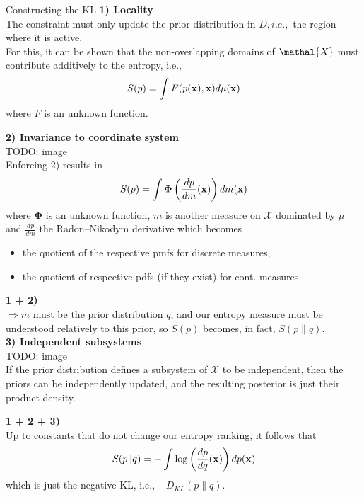 \documentclass[11pt,compress,t,notes=noshow, xcolor=table]{beamer}
\begin{document}
\begin{vbframe}{Constructing the KL}
    \textbf{1) Locality} \\
    The constraint must only update the prior distribution in $D, i.e.,$ the region where it is active. \\

    \lz
    For this, it can be shown that the non-overlapping domains of $\mathal{X}$ must contribute additively to the entropy, i.e.,
    $$S(p) = \int F(p(\mathbf{x}), \mathbf{x}) d\mu(\mathbf{x})$$
    where $F$ is an unknown function.
    
    \framebreak
    
    \textbf{2) Invariance to coordinate system} \\
    \lz 
    TODO: image \\
    \lz
    Enforcing 2) results in 
    $$S(p) = \int \bm{\Phi}\left(\frac{dp}{dm}(\mathbf{x})\right)dm(\mathbf{x})$$
    where $\bm{\Phi}$ is an unknown function, $m$ is another measure on $\mathcal{X}$ dominated by $\mu$ and $\frac{dp}{dm}$ the Radon–Nikodym derivative which becomes 
    \begin{itemize}
        \item the quotient of the respective pmfs for discrete measures,
        \item the quotient of respective pdfs (if they exist) for cont. measures.
    \end{itemize} 

    \framebreak

    \textbf{1 + 2)} 
    \\ $\Rightarrow m$ must be the prior distribution $q$, and our entropy measure must be understood relatively to this prior, so $S(p)$ becomes, in fact, $S(p\|q).$\\
    \lz 
    \textbf{3) Independent subsystems} \\
    TODO: image \\
    \lz
    If the prior distribution defines a subsystem of $\mathcal{X}$ to be independent, then the priors can be independently updated, and the resulting posterior is just their product density.
    
    \framebreak

    \textbf{1 + 2 + 3)} \\
    Up to constants that do not change our entropy ranking, it follows that 
    $$S(p\|q) = - \int \log\left(\frac{dp}{dq}(\mathbf{x})\right)dp(\mathbf{x})$$
    which is just the negative KL, i.e., $-D_{KL}(p\|q).$


\end{vbframe}
\end{document}
